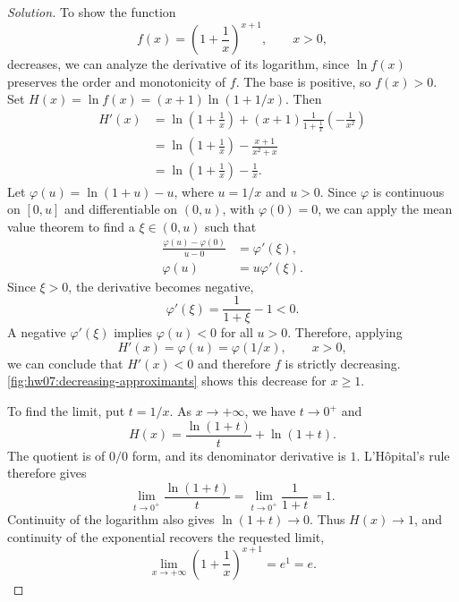 \begin{proof}[Solution]
  To show the function
  \[
    f(x)=\left(1+\frac1x\right)^{x+1},
    \qquad x>0,
  \]
  decreases, we can analyze the derivative of its logarithm, since
  $\ln f(x)$ preserves the order and monotonicity of $f$.
  The base is positive, so $f(x)>0$. Set
  $H(x)=\ln f(x)=(x+1)\ln(1+1/x)$. Then
  \[
    \begin{aligned}
      H'(x)&=\ln\left(1+\frac1x\right)
        +(x+1)\frac1{1+\frac1x}\left(-\frac1{x^2}\right)\\
        &=\ln\left(1+\frac1x\right)-\frac{x+1}{x^2+x}\\
        &=\ln\left(1+\frac1x\right)-\frac1x.
    \end{aligned}
  \]
  Let $\varphi(u)=\ln(1+u)-u$, where $u=1/x$ and $u>0$.
  Since $\varphi$ is
  continuous on $[0,u]$ and differentiable on
  $(0,u)$, with $\varphi(0)=0$, we can apply the mean value theorem
  to find a $\xi\in(0,u)$ such that
  \[
    \begin{aligned}
      \frac{\varphi(u)-\varphi(0)}{u-0}&=\varphi'(\xi),\\
      \varphi(u)&=u\varphi'(\xi).
    \end{aligned}
  \]
  Since $\xi>0$, the derivative becomes negative,
  \[
    \varphi'(\xi)=\frac1{1+\xi}-1<0.
  \]
  A negative $\varphi'(\xi)$ implies $\varphi(u)<0$ for all $u>0$.
  Therefore, applying
  \[
    H'(x)=\varphi(u)=\varphi(1/x),\qquad
      x>0,
  \]
  we can conclude that $H'(x)<0$ and therefore $f$ is strictly
  decreasing.
  \autoref{fig:hw07:decreasing-approximants}
  shows this decrease for $x\ge1$.
  \begin{marginfigure}
    \centering
    
    \caption[Decreasing exponential approximants.]{%
      The actual graph for $x\ge1$ descends toward $e$. The limit
      calculation establishes the dashed level. Since $f$ is
      strictly decreasing on $x>0$, every value remains above $e$.}
    \label{fig:hw07:decreasing-approximants}
  \end{marginfigure}

  To find the limit, put $t=1/x$. As
  $x\to+\infty$, we have $t\to0^+$ and
  \[
    H(x)
      =\frac{\ln(1+t)}{t}+\ln(1+t).
  \]
  The quotient is of $0/0$ form, and its
  denominator derivative is $1$. L'H\^opital's rule therefore gives
  \[
    \lim_{t\to0^+}\frac{\ln(1+t)}{t}
      =\lim_{t\to0^+}\frac1{1+t}=1.
  \]
  Continuity of the logarithm also gives
  $\ln(1+t)\to0$. Thus $H(x)\to1$, and continuity of the
  exponential recovers the requested limit,
  \[
    \lim_{x\to+\infty}
      \left(1+\frac1x\right)^{x+1}=e^1=e.
  \]
\end{proof}
